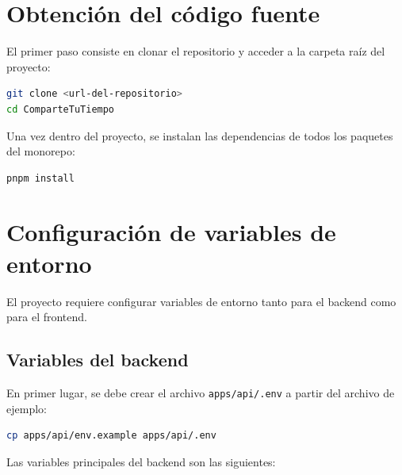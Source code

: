 \section{Obtención del código fuente}

El primer paso consiste en clonar el repositorio y acceder a la carpeta raíz del proyecto:

\begin{lstlisting}[language=bash, caption={Clonación del repositorio}, label={lst:manual_instalacion_clone}]
git clone <url-del-repositorio>
cd ComparteTuTiempo
\end{lstlisting}

Una vez dentro del proyecto, se instalan las dependencias de todos los paquetes del monorepo:

\begin{lstlisting}[language=bash, caption={Instalación de dependencias}, label={lst:manual_instalacion_dependencias}]
pnpm install
\end{lstlisting}

\section{Configuración de variables de entorno}

El proyecto requiere configurar variables de entorno tanto para el backend como para el frontend.

\subsection{Variables del backend}

En primer lugar, se debe crear el archivo \texttt{apps/api/.env} a partir del archivo de ejemplo:

\begin{lstlisting}[language=bash, caption={Creación del archivo de entorno del backend}, label={lst:manual_instalacion_env_api}]
cp apps/api/env.example apps/api/.env
\end{lstlisting}

Las variables principales del backend son las siguientes:

